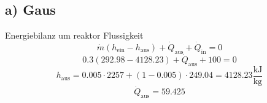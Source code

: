 \subsection*{a) Gaus}

Energiebilanz um reaktor Flussigkeit
\[
\dot{m} \left( h_{\text{ein}} - h_{\text{aus}} \right) + \dot{Q}_{\text{aus}} + \dot{Q}_{\text{in}} = 0
\]
\[
0.3 \left( 292.98 - 4128.23 \right) + \dot{Q}_{\text{aus}} + 100 = 0
\]
\[
h_{\text{aus}} = 0.005 \cdot 2257 + (1 - 0.005) \cdot 249.04 = 4128.23 \frac{\text{kJ}}{\text{kg}}
\]
\[
\dot{Q}_{\text{aus}} = 59.425
\]